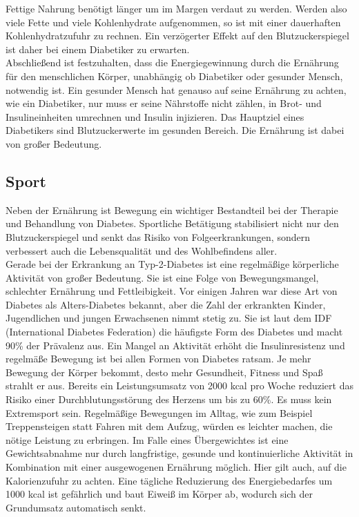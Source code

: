 		Fettige Nahrung benötigt länger um im Margen verdaut zu werden. Werden also viele Fette und viele Kohlenhydrate aufgenommen, so ist mit einer dauerhaften Kohlenhydratzufuhr zu rechnen. Ein verzögerter Effekt auf den Blutzuckerspiegel ist daher bei einem Diabetiker zu erwarten. \cite{SG}\\
		Abschließend ist festzuhalten, dass die Energiegewinnung durch die Ernährung für den menschlichen Körper, unabhängig ob Diabetiker oder gesunder Mensch, notwendig ist. Ein gesunder Mensch hat genauso auf seine Ernährung zu achten, wie ein Diabetiker, nur muss er seine Nährstoffe nicht zählen, in Brot- und Insulineinheiten umrechnen und Insulin injizieren. Das Hauptziel eines Diabetikers sind Blutzuckerwerte im gesunden Bereich. Die Ernährung ist dabei von großer Bedeutung.

\subsection{Sport}
	Neben der Ernährung ist Bewegung ein wichtiger Bestandteil bei der Therapie und Behandlung von Diabetes. Sportliche Betätigung stabilisiert nicht nur den Blutzuckerspiegel und senkt das Risiko von Folgeerkrankungen, sondern verbessert auch die Lebensqualität und des Wohlbefindens aller. \cite{SG}\\
	Gerade bei der Erkrankung an Typ-2-Diabetes ist eine regelmäßige körperliche Aktivität von großer Bedeutung. Sie ist eine Folge von Bewegungsmangel, schlechter Ernährung und Fettleibigkeit. Vor einigen Jahren war diese Art von Diabetes als \glqq Alters-Diabetes\grqq{} bekannt, aber die Zahl der erkrankten Kinder, Jugendlichen und jungen Erwachsenen nimmt stetig zu. Sie ist laut dem IDF (International Diabetes Federation) die häufigste Form des Diabetes und macht 90\% der Prävalenz aus. \cite{IDF}\newline
	Ein Mangel an Aktivität erhöht die Insulinresistenz und regelmäße Bewegung ist bei allen Formen von Diabetes ratsam. Je mehr Bewegung der Körper bekommt, desto mehr Gesundheit, Fitness und Spaß strahlt er aus. Bereits ein Leistungsumsatz von 2000 kcal pro Woche reduziert das Risiko einer Durchblutungsstörung des Herzens um bis zu 60\%. Es muss kein Extremsport sein. Regelmäßige Bewegungen im Alltag, wie zum Beispiel Treppensteigen statt Fahren mit dem Aufzug, würden es leichter machen, die nötige Leistung zu erbringen. \newline
	Im Falle eines Übergewichtes ist eine Gewichtsabnahme nur durch langfristige, gesunde und kontinuierliche Aktivität in Kombination mit einer ausgewogenen Ernährung möglich. Hier gilt auch, auf die Kalorienzufuhr zu achten. Eine tägliche Reduzierung des Energiebedarfes um 1000 kcal ist gefährlich und baut Eiweiß im Körper ab, wodurch sich der Grundumsatz automatisch senkt.\newline 

